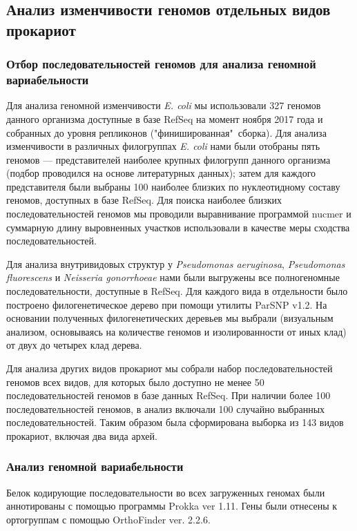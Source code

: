 \subsection*{Анализ изменчивости геномов отдельных видов прокариот}
\subsubsection*{Отбор последовательностей геномов для анализа геномной вариабельности}
Для анализа геномной изменчивости \textit{E. coli} мы использовали 327 геномов данного организма доступные в базе RefSeq на момент ноября 2017 года и собранных до уровня репликонов ("финишированная"\ сборка). Для анализа изменчивости в различных филогруппах \textit{E. coli} нами были отобраны пять геномов --- представителей наиболее крупных филогрупп данного организма (подбор проводился на основе литературных данных); затем для каждого представителя были выбраны 100 наиболее близких по нуклеотидному составу геномов, доступных в базе RefSeq. Для поиска наиболее близких последовательностей геномов мы проводили выравнивание программой nucmer и суммарную длину выровненных участков использовали в качестве меры сходства последовательностей. 

Для анализа внутривидовых структур у \textit{Pseudomonas aeruginosa}, \textit{Pseudomonas fluorescens} и \textit{Neisseria gonorrhoeae} нами были выгружены все полногеномные последовательности, доступные в RefSeq. Для каждого вида в отдельности было построено филогенетическое дерево при помощи утилиты ParSNP v1.2. На основании полученных филогенетических деревьев мы выбрали (визуальным анализом, основываясь на количестве геномов и изолированности от иных клад) от двух до четырех клад дерева. 

Для анализа других видов прокариот мы собрали набор последовательностей геномов всех видов, для которых было доступно не менее 50 последовательностей геномов в базе данных RefSeq. При наличии более 100 последовательностей геномов, в анализ включали 100 случайно выбранных последовательностей. Таким образом была сформирована выборка из 143 видов прокариот, включая два вида архей.

\subsubsection*{Анализ геномной вариабельности}
Белок кодирующие последовательности во всех загруженных геномах были аннотированы с помощью программы Prokka ver 1.11. Гены были отнесены к ортогруппам с помощью OrthoFinder ver. 2.2.6. 

